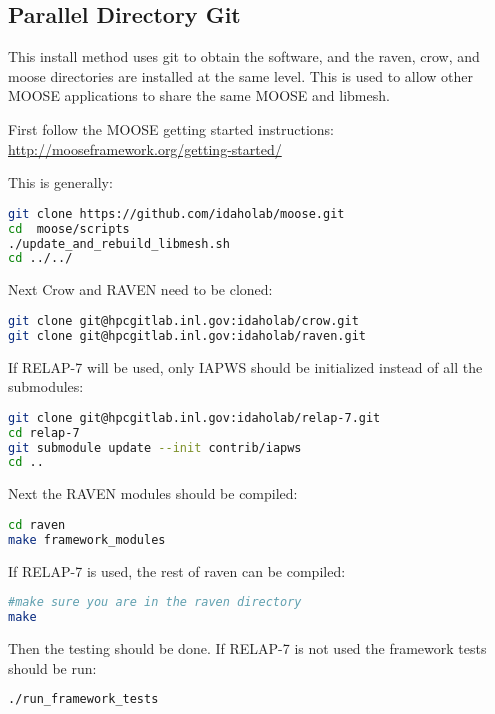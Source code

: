 \subsection{Parallel Directory Git}
\label{parallel_directory_git}

This install method uses git to obtain the software, and the raven,
crow, and moose directories are installed at the same level.  This is
used to allow other MOOSE applications to share the same MOOSE and
libmesh.

First follow the MOOSE getting started instructions:  \url{http://mooseframework.org/getting-started/}

This is generally:

\begin{lstlisting}[language=bash]
git clone https://github.com/idaholab/moose.git
cd  moose/scripts
./update_and_rebuild_libmesh.sh
cd ../../
\end{lstlisting}

Next Crow and RAVEN need to be cloned:

\begin{lstlisting}[language=bash]
git clone git@hpcgitlab.inl.gov:idaholab/crow.git
git clone git@hpcgitlab.inl.gov:idaholab/raven.git
\end{lstlisting}

If RELAP-7 will be used, only IAPWS should be initialized instead of
all the submodules:

\begin{lstlisting}[language=bash]
git clone git@hpcgitlab.inl.gov:idaholab/relap-7.git
cd relap-7
git submodule update --init contrib/iapws
cd ..
\end{lstlisting}

Next the RAVEN modules should be compiled:

\begin{lstlisting}[language=bash]
cd raven
make framework_modules
\end{lstlisting}

If RELAP-7 is used, the rest of raven can be compiled:

\begin{lstlisting}[language=bash]
#make sure you are in the raven directory
make
\end{lstlisting}


Then the testing should be done.  If RELAP-7 is not used the framework
tests should be run:

\begin{lstlisting}[language=bash]
  ./run_framework_tests
\end{lstlisting}

